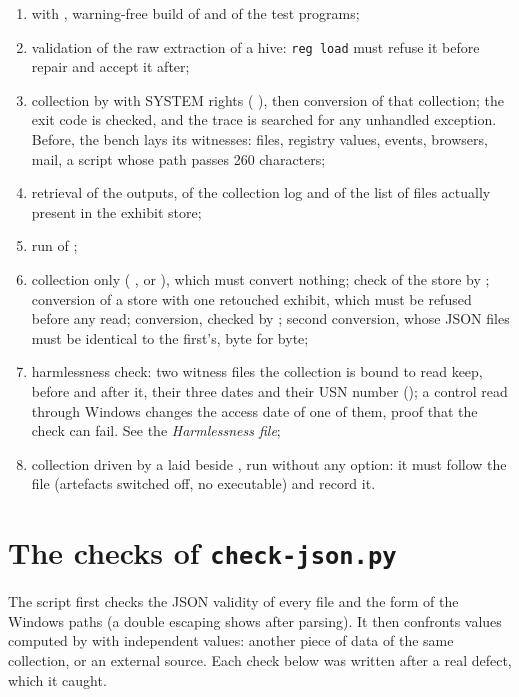 \documentclass[11pt,a4paper,oneside]{report}
\begin{document}
\begin{enumerate}
  \item with , warning-free build of \wac{} and of the test
    programs;
  \item validation of the raw extraction of a hive: \texttt{reg load} must
    refuse it before repair and accept it after;
  \item collection by \wac{} with SYSTEM rights ( 
    ), then conversion of that collection; the exit code is
    checked, and the trace is searched for any unhandled exception. Before,
    the bench lays its witnesses: files, registry values, events, browsers,
    mail, a script whose path passes 260 characters;
  \item retrieval of the outputs, of the collection log and of the list of
    files actually present in the exhibit store;
  \item run of ;
  \item collection only (  , or
    ), which must convert nothing; check of the store by
    ; conversion of a store with one retouched
    exhibit, which must be refused before any read; conversion, checked by
    ; second conversion, whose JSON files must be
    identical to the first's, byte for byte;
  \item harmlessness check: two witness files the collection is bound to read
    keep, before and after it, their three dates and their USN number
    (); a control read through Windows changes the
    access date of one of them, proof that the check can fail. See the
    \emph{Harmlessness file};
  \item collection driven by a  laid beside \wac{}, run
    without any option: it must follow the file (artefacts switched off, no
    executable) and record it.
\end{enumerate}

\section{The checks of \texttt{check-json.py}}

The script first checks the JSON validity of every file and the form of the
Windows paths (a double escaping shows after parsing). It then confronts values
computed by \wac{} with independent values: another piece of data of the same
collection, or an external source. Each check below was written after a real
defect, which it caught.
\end{document}

